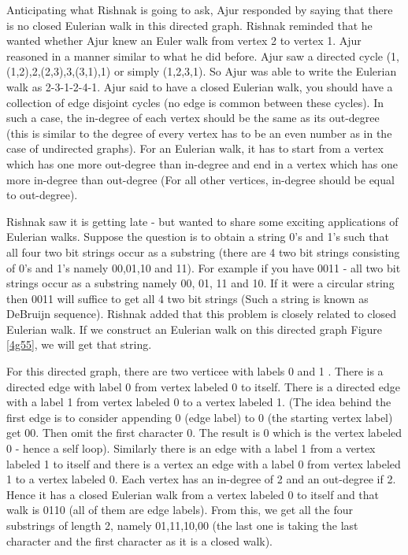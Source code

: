 Anticipating what Rishnak is going to ask, Ajur responded by saying that there is no closed Eulerian walk in this directed graph. Rishnak reminded that he wanted whether Ajur knew an Euler walk from vertex 2 to vertex 1. Ajur reasoned in a  manner similar to what he did before. Ajur saw a directed cycle (1,(1,2),2,(2,3),3,(3,1),1) or simply (1,2,3,1). So Ajur was able to write the Eulerian walk as 2-3-1-2-4-1. Ajur said to have a closed Eulerian walk, you should have a collection of edge disjoint cycles (no edge is common between these cycles). In such a case, the in-degree of each vertex should be the same as its out-degree (this is similar to the degree of every vertex has to be an even number as in the case of undirected graphs). For an Eulerian walk, it has to start from a vertex which has one more out-degree than in-degree and end in a vertex which has one more in-degree than out-degree (For all other vertices, in-degree should be equal to out-degree).

Rishnak saw it is getting late - but wanted to share some exciting applications of Eulerian walks. 
Suppose the question is to obtain a string 0's and 1's such that all four two bit strings occur as a substring (there are 4 two bit strings consisting of 0's and 1's namely 00,01,10 and 11). For example if you have 0011 - all two bit strings occur as a substring namely 00, 01, 11 and 10. If it were a circular string then 0011 will suffice to get all 4 two bit strings (Such a string is known as DeBruijn sequence). Rishnak added that this problem is closely related to closed Eulerian walk. If we construct an Eulerian walk on this directed graph Figure \ref{4g55}, we will get that string.

For this directed graph, there are two verticee with labels 0 and 1 . There is a directed edge with label 0 from vertex labeled 0 to itself. There is a directed edge with a label 1 from vertex labeled 0 to a vertex labeled 1. (The idea behind the first edge is to consider appending 0 (edge label) to 0 (the starting vertex label) get 00. Then omit the first character 0. The result is 0 which is the vertex labeled 0 - hence a self loop). Similarly there is an edge with a label 1 from a vertex labeled 1 to itself and there is a vertex an edge with 
a label 0 from vertex labeled 1 to a vertex labeled 0.
Each vertex has an in-degree of 2 and an out-degree if 2. Hence it has a closed Eulerian walk from a vertex labeled 0 to itself and that walk is 0110 (all of them are edge labels). From this, we get all the four substrings of length 2, namely 01,11,10,00 (the last one is taking the last character and the first character as it is a closed walk).

